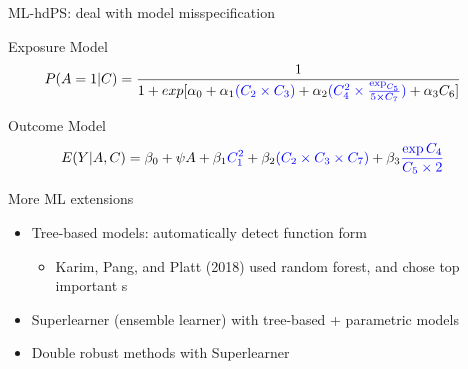 \documentclass[
  ignorenonframetext,
  aspectratio=169]{beamer}
\providecommand{\tightlist}{%
  \setlength{\itemsep}{0pt}\setlength{\parskip}{0pt}}
\begin{document}
\begin{frame}{ML-hdPS: deal with model misspecification}
\protect\hypertarget{ml-hdps-deal-with-model-misspecification}{}
\begin{block}{Exposure Model}
\protect\hypertarget{exposure-model-2}{}
\begin{equation} 
\begin{aligned}
P(A=1|C) &= \frac{1}{1+exp[\alpha_0 + \alpha_1 \textcolor{blue}{(C_2 \times C_3)} + \alpha_2 \textcolor{blue}{(C_4^2 \times \frac{\exp_{C_5}}{5 \times C_7})} + \alpha_3 C_6 ]} \nonumber
\end{aligned}
\end{equation}
\end{block}

\begin{block}{Outcome Model}
\protect\hypertarget{outcome-model-2}{}
\begin{equation} 
\begin{aligned}
E(Y|A,C) &= \beta_0 + \psi A + \beta_1 \textcolor{blue}{C_1^2} + \beta_2 \textcolor{blue}{(C_2 \times C_3 \times C_7)} + \beta_3 \textcolor{blue}{\frac{\exp{C_4}}{C_5 \times 2}}\nonumber
\end{aligned}
\end{equation}
\end{block}

\begin{block}{More ML extensions}
\protect\hypertarget{more-ml-extensions}{}
\begin{itemize}
\tightlist
\item
  Tree-based models: automatically detect function form

  \begin{itemize}
  \tightlist
  \item
    Karim, Pang, and Platt (2018) used random forest, and chose top
    important \textcolor{blue}{}s
  \end{itemize}
\item
  Superlearner (ensemble learner) with tree-based + parametric models
\item
  Double robust methods with Superlearner
\end{itemize}
\end{block}
\end{frame}
\end{document}
